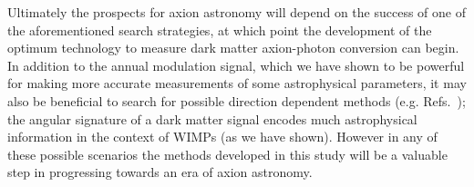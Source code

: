 Ultimately the prospects for axion astronomy will depend on the success of one of the aforementioned search strategies, at which point the development of the optimum technology to measure dark matter axion-photon conversion can begin. In addition to the annual modulation signal, which we have shown to be powerful for making more accurate measurements of some astrophysical parameters, it may also be beneficial to search for possible direction dependent methods (e.g. Refs.~\cite{Irastorza:2012jq,Horns:2012jf,Jaeckel:2015kea}); the angular signature of a dark matter signal encodes much astrophysical information in the context of WIMPs (as we have shown). However in any of these possible scenarios the methods developed in this study will be a valuable step in progressing towards an era of axion astronomy.


